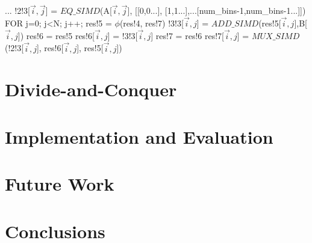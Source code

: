 \documentclass[sigconf, screen, natbib=false, dvipsnames, table]{acmart}
\theoremstyle{definition}
\begin{document}
\begin{algorithmic}
\STATE ...
\STATE !2!3[$\stackrel{\rightarrow}i,\stackrel{\rightarrow}j$] = $\mathit{EQ\_SIMD}$(A[$\stackrel{\rightarrow}i,\stackrel{\rightarrow}j$], [[0,0...], [1,1...],...[num\_bins-1,num\_bins-1...]])
\STATE FOR j=0; j<N; j++; 
\STATE \hspace{0.25cm}            res!5 = $\phi$(res!4, res!7) 
\STATE \hspace{0.25cm}            !3!3[$\stackrel{\rightarrow}i,j$] = $\mathit{ADD\_SIMD}$(res!5[$\stackrel{\rightarrow}i,j$],B[$\stackrel{\rightarrow}i,j$])
\STATE \hspace{0.25cm}            res!6 = res!5 
\STATE \hspace{0.25cm}            res!6[$\stackrel{\rightarrow}i,j$] = !3!3[$\stackrel{\rightarrow}i,j$]
\STATE \hspace{0.25cm}            res!7 = res!6
\STATE \hspace{0.25cm}            res!7[$\stackrel{\rightarrow}i,j$] = $\mathit{MUX\_SIMD}$(!2!3[$\stackrel{\rightarrow}i,j$], res!6[$\stackrel{\rightarrow}i,j$], res!5[$\stackrel{\rightarrow}i,j$])
\end{algorithmic}


\section{Divide-and-Conquer}


\section{Implementation and Evaluation}
\label{sec:implementation}


\section{Future Work}
\label{sec:implementation_and_benchmarks}
%
%

\section{Conclusions}
\label{sec:conclusion}
%


\printbibliography

\end{document}
